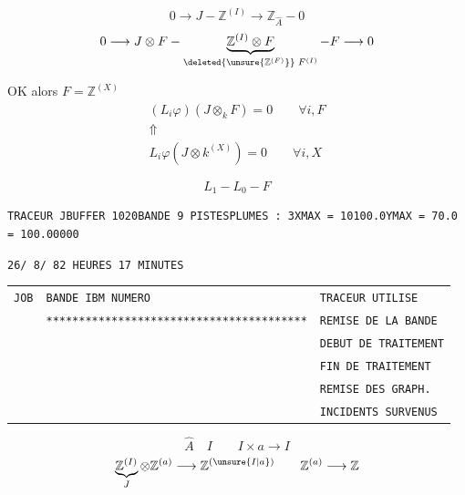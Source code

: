 \[
0\longrightarrow J\mathbin{-}\mathbb Z^{(I)}\longrightarrow\mathbb Z_{\widehat A}\mathbin{-}0
\]
\[
0\longrightarrow J\otimes F\mathbin{-}
\underbrace{\mathbb Z^{(I)}\otimes F}_{\deleted{\unsure{\mathbb Z^{(F)}}}\;F^{(I)}}
\mathbin{-}F\longrightarrow0
\]

OK alors $F=\mathbb Z^{(X)}$
\[
\begin{gathered}
(L_i\varphi)(J\otimes_kF)=0\qquad\forall i,F\\
\Uparrow\\
L_i\varphi(J\otimes k^{(X)})=0\qquad\forall i,X
\end{gathered}
\]



\[
L_1\mathbin{-}L_0\mathbin{-}F
\]



\noindent\texttt{TRACEUR J\quad BUFFER 1020\quad BANDE 9 PISTES\quad PLUMES : 3\quad XMAX = 10100.0\quad YMAX = 70.0\quad {} = 100.00000}

\noindent\texttt{26/ 8/ 82 HEURES 17 MINUTES}

\begin{tabular}{lll}
\texttt{JOB}&\texttt{BANDE IBM NUMERO}&\texttt{TRACEUR UTILISE}\\
&\texttt{****************************************}&\texttt{REMISE DE LA BANDE}\\
&&\texttt{DEBUT DE TRAITEMENT}\\
&&\texttt{FIN DE TRAITEMENT}\\
&&\texttt{REMISE DES GRAPH.}\\
&&\texttt{INCIDENTS SURVENUS}
\end{tabular}

\[
\widehat A\quad I\qquad I\times a\longrightarrow I
\]
\[
\underbrace{\mathbb Z^{(I)}}_J\otimes\mathbb Z^{(a)}\longrightarrow\mathbb Z^{(\unsure{I|a})}
\qquad \mathbb Z^{(a)}\longrightarrow\mathbb Z
\]

